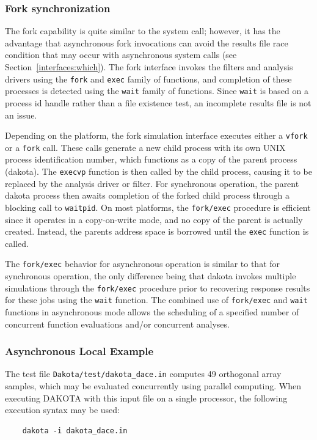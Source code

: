 \subsubsection{Fork synchronization}\label{parallel:SLP:local:fork}

The fork capability is quite similar to the system call; however, it
has the advantage that asynchronous fork invocations can avoid the
results file race condition that may occur with asynchronous system
calls (see Section~\ref{interfaces:which}). The fork interface invokes
the filters and analysis drivers using the \texttt{fork} and
\texttt{exec} family of functions, and completion of these processes
is detected using the \texttt{wait} family of functions. Since
\texttt{wait} is based on a process id handle rather than a file
existence test, an incomplete results file is not an issue.

Depending on the platform, the fork simulation interface executes
either a \texttt{vfork} or a \texttt{fork} call. These calls generate
a new child process with its own UNIX process identification number,
which functions as a copy of the parent process (dakota). The
\texttt{execvp} function is then called by the child process, causing
it to be replaced by the analysis driver or filter. For synchronous
operation, the parent dakota process then awaits completion of the
forked child process through a blocking call to \texttt{waitpid}. On
most platforms, the \texttt{fork/exec} procedure is efficient since it
operates in a copy-on-write mode, and no copy of the parent is
actually created. Instead, the parents address space is borrowed until
the \texttt{exec} function is called.

The \texttt{fork/exec} behavior for asynchronous operation is similar
to that for synchronous operation, the only difference being that
dakota invokes multiple simulations through the \texttt{fork/exec}
procedure prior to recovering response results for these jobs using
the \texttt{wait} function. The combined use of \texttt{fork/exec} and
\texttt{wait} functions in asynchronous mode allows the scheduling of
a specified number of concurrent function evaluations and/or
concurrent analyses.

\subsubsection{Asynchronous Local Example}\label{parallel:SLP:local:ex}

The test file \texttt{Dakota/test/dakota\_dace.in} computes 49
orthogonal array samples, which may be evaluated concurrently using
parallel computing.  When executing DAKOTA with this input file on a
single processor, the following execution syntax may be used:
\begin{small}
\begin{verbatim}
    dakota -i dakota_dace.in
\end{verbatim}
\end{small}

